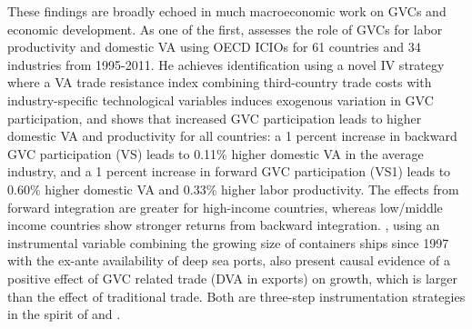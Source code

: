 \documentclass[a4paper]{article}
\begin{document}
These findings are broadly echoed in much macroeconomic work on GVCs and economic development. As one of the first, \citet{Kummritz20161} assesses the role of GVCs for labor productivity and domestic VA using OECD ICIOs for 61 countries and 34 industries from 1995-2011. He achieves identification using a novel IV strategy where a VA trade resistance index combining third-country trade costs with industry-specific technological variables induces exogenous variation in GVC participation, and shows that increased GVC participation leads to higher domestic VA and productivity for all countries: a 1 percent increase in backward GVC participation (VS) leads to 0.11\% higher domestic VA in the average industry, and a 1 percent increase in forward GVC participation (VS1) leads to 0.60\% higher domestic VA and 0.33\% higher labor productivity. %
The effects from forward integration are greater for high-income countries, whereas low/middle income countries show stronger returns from backward integration.  %
\citet{altomonte2018trade}, using an instrumental variable combining the growing size of containers ships since 1997 with the ex-ante availability of deep sea ports, also present causal evidence of a positive effect of GVC related trade (DVA in exports) on growth, which is larger than the effect of traditional trade. Both are three-step instrumentation strategies in the spirit of \citet{romer1999does} and \citet{feyrer2009distance, feyrer2019trade}. \newline %
\end{document}

